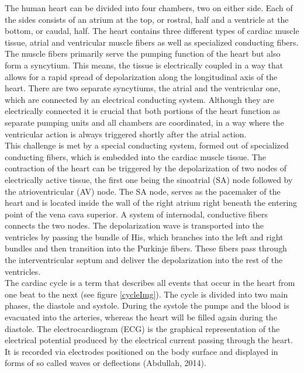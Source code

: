 The human heart can be divided into four chambers, two on either side. Each of the sides consists of an atrium at the top, or rostral, half and a ventricle at the bottom, or caudal, half. The heart contains three different types of cardiac muscle tissue, atrial and ventricular muscle fibers as well as specialized conducting fibers. The muscle fibers primarily serve the pumping function of the heart but also form a syncytium. This means, the tissue is electrically coupled in a way that allows for a rapid spread of depolarization along the longitudinal axis of the heart. There are two separate syncytiums, the atrial and the ventricular one, which are connected by an electrical conducting system. Although they are electrically connected it is crucial that both portions of the heart function as separate pumping units and all chambers are coordinated, in a way where the ventricular action is always triggered shortly after the atrial action.\\
This challenge is met by a special conducting system, formed out of specialized conducting fibers, which is embedded into the cardiac muscle tissue. The contraction of the heart can be triggered by the depolarization of two nodes of electrically active tissue, the first one being the sinoatrial (SA) node followed by the atrioventricular (AV) node. The SA node, serves as the pacemaker of the heart and is located inside the wall of the right atrium right beneath the entering point of the vena cava superior.  
A system of internodal, conductive fibers connects the two nodes. The depolarization wave is transported into the ventricles by passing the bundle of His, which branches into the left and right bundles and then transition into the Purkinje fibers. These fibers pass through the interventricular septum and deliver the depolarization into the rest of the ventricles.\\
The cardiac cycle is a term that describes all events that occur in the heart from one beat to the next (see figure \ref{cycleImg}). The cycle is divided into two main phases, the diastole and systole. During the systole the pumps and the blood is evacuated into the arteries, whereas the heart will be filled again during the diastole. The electrocardiogram (ECG) is the graphical representation of the electrical potential produced by the electrical current passing through the heart. It is recorded via electrodes positioned on the body surface and displayed in forms of so called waves or deflections (Abdullah, 2014).


